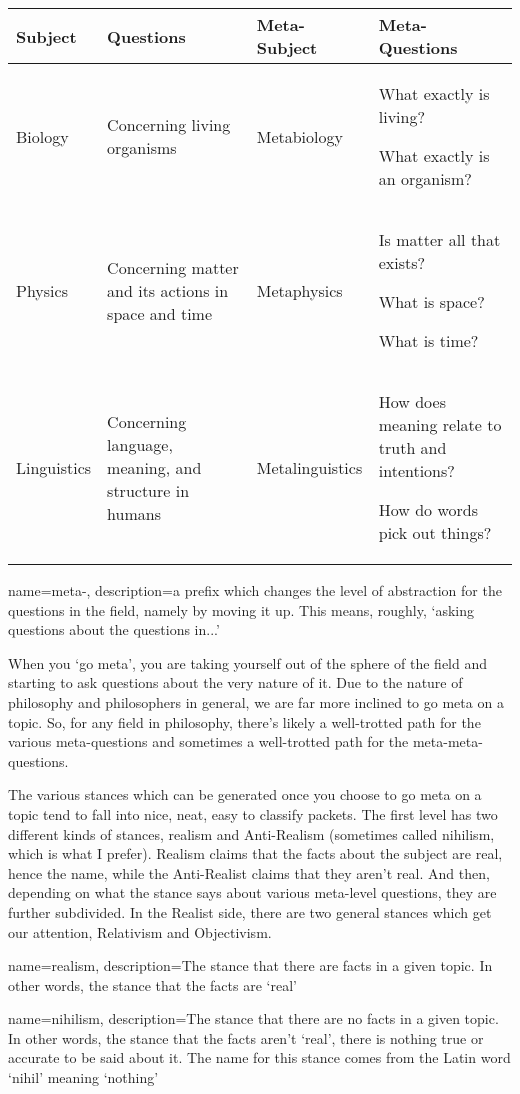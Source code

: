 \noindent
\begin{tabular}{p{1in}|p{1.5in}|p{1.2in}|p{1.5in}}
Subject&Questions &Meta-Subject&Meta-Questions\\\hline
Biology&Concerning living organisms&Metabiology&What exactly is living? 

What exactly is an organism?\\\hline
Physics&Concerning matter and its actions in space and time&Metaphysics&Is matter all that exists? 

What is space? 

What is time?\\ \hline
Linguistics&Concerning language, meaning, and structure in humans&Metalinguistics&How does meaning relate to truth and intentions? 

How do words pick out things? \\
\end{tabular}

{
  name=meta-,
  description={a prefix which changes the level of abstraction for the questions in the field, namely by moving it up. This means, roughly, `asking questions about the questions in...'}
}


When you ‘go meta’, you are taking yourself out of the sphere of the field and starting to ask questions about the very nature of it. Due to the nature of philosophy and philosophers in general, we are far more inclined to go meta on a topic. So, for any field in philosophy, there’s likely a well-trotted path for the various meta-questions and sometimes a well-trotted path for the meta-meta-questions.

The various stances which can be generated once you choose to go meta on a topic tend to fall into nice, neat, easy to classify packets. The first level has two different kinds of stances, \Gls{realism} and Anti-Realism (sometimes called \Gls{nihilism}, which is what I prefer). Realism claims that the facts about the subject are real, hence the name, while the Anti-Realist claims that they aren't real. And then, depending on what the stance says about various meta-level questions, they are further subdivided. In the Realist side, there are two general stances which get our attention, Relativism and Objectivism.

{
  name=realism,
  description={The stance that there are facts in a given topic. In other words, the stance that the facts are `real'}
}

{
  name=nihilism,
  description={The stance that there are no facts in a given topic. In other words, the stance that the facts aren't `real', there is nothing true or accurate to be said about it. The name for this stance comes from the Latin word `nihil' meaning `nothing'}
}


